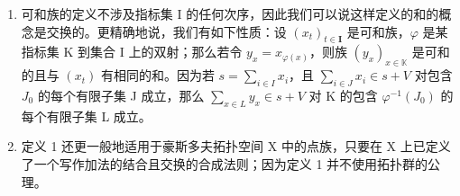 \begin{enumerate}
\def\labelenumi{\arabic{enumi})}
\setcounter{enumi}{1}
\item
  可和族的定义不涉及指标集 I 的任何次序，因此我们可以说这样定义的和的概念是交换的。更精确地说，我们有如下性质：设 \((x_{t})_{t\in \mathbf{I}}\) 是可和族，\(\varphi\) 是某指标集 K 到集合 I 上的双射；那么若令 \(y_{x} = x_{\varphi (x)}\)，则族 \((y_{x})_{x\in \mathbb{K}}\) 是可和的且与 \((x_{t})\) 有相同的和。因为若 \(s = \sum_{i\in I}x_i\)，且 \(\sum_{i\in J}x_i\in s + V\) 对包含 \(J_0\) 的每个有限子集 J 成立，那么 \(\sum_{x\in L}y_x\in s + V\) 对 K 的包含 \(\varphi^{-1}(J_0)\) 的每个有限子集 L 成立。
\item
  定义 1 还更一般地适用于豪斯多夫拓扑空间 X 中的点族，只要在 X 上已定义了一个写作加法的结合且交换的合成法则；因为定义 1 并不使用拓扑群的公理。
\end{enumerate}

